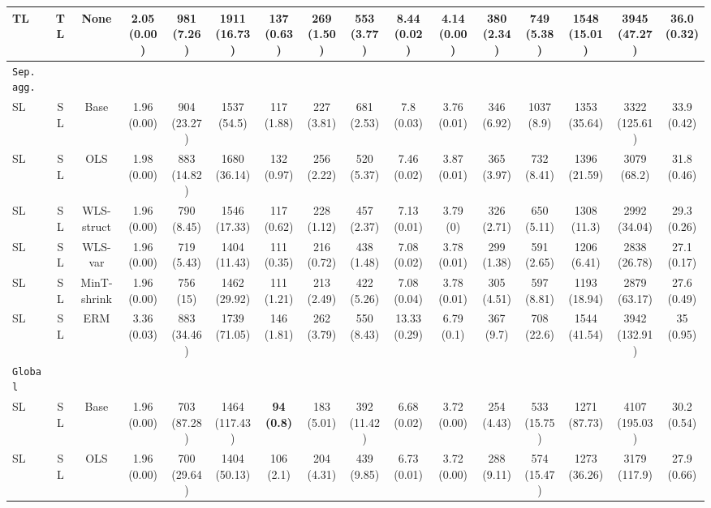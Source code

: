 \documentclass[preprint, 3p, times, twocolumn]{elsarticle}
\begin{document}
\begin{sidewaystable*}[t]
\begin{center}
{\begin{tabular}{l c cccccccccccccc}
  \hspace{0.1cm} 	TL	&TL	&None	&2.05 (0.00)	&981 (7.26)	&1911 (16.73)	&137 (0.63)	&269 (1.50)	&553 (3.77)	&8.44 (0.02)	&4.14 (0.00)	&380 (2.34)	&749 (5.38)	&1548 (15.01)	&3945 (47.27)	&36.0 (0.32)	\\
  \midrule																	
  \texttt{Sep. agg.}																	\\
  \hspace{0.1cm} 	SL	&SL	&Base	&1.96 (0.00)	&904 (23.27)	&1537 (54.5)	&117 (1.88)	&227 (3.81)	&681 (2.53)	&7.8 (0.03)	&3.76 (0.01)	&346 (6.92)	&1037 (8.9)	&1353 (35.64)	&3322 (125.61)	&33.9 (0.42)	\\
  \hspace{0.1cm} 	SL	&SL	&OLS	&1.98 (0.00)	&883 (14.82)	&1680 (36.14)	&132 (0.97)	&256 (2.22)	&520 (5.37)	&7.46 (0.02)	&3.87 (0.01)	&365 (3.97)	&732 (8.41)	&1396 (21.59)	&3079 (68.2)	&31.8 (0.46)	\\
  \hspace{0.1cm} 	SL	&SL	&WLS-struct	&1.96 (0.00)	&790 (8.45)	&1546 (17.33)	&117 (0.62)	&228 (1.12)	&457 (2.37)	&7.13 (0.01)	&3.79 (0)	&326 (2.71)	&650 (5.11)	&1308 (11.3)	&2992 (34.04)	&29.3 (0.26)	\\
  \hspace{0.1cm} 	SL	&SL	&WLS-var	&1.96 (0.00)	&719 (5.43)	&1404 (11.43)	&111 (0.35)	&216 (0.72)	&438 (1.48)	&7.08 (0.02)	&3.78 (0.01)	&299 (1.38)	&591 (2.65)	&1206 (6.41)	&2838 (26.78)	&27.1 (0.17)	\\
  \hspace{0.1cm} 	SL	&SL	&MinT-shrink	&1.96 (0.00)	&756 (15)	&1462 (29.92)	&111 (1.21)	&213 (2.49)	&422 (5.26)	&7.08 (0.04)	&3.78 (0.01)	&305 (4.51)	&597 (8.81)	&1193 (18.94)	&2879 (63.17)	&27.6 (0.49)	\\
  \hspace{0.1cm} 	SL	&SL	&ERM	&3.36 (0.03)	&883 (34.46)	&1739 (71.05)	&146 (1.81)	&262 (3.79)	&550 (8.43)	&13.33 (0.29)	&6.79 (0.1)	&367 (9.7)	&708 (22.6)	&1544 (41.54)	&3942 (132.91)	&35 (0.95)	\\
  \midrule																	
  \texttt{Global}																	\\
  \hspace{0.1cm} 	SL	&SL	&Base	&1.96 (0.00)	&703 (87.28)	&1464 (117.43)	&\textbf{94 (0.8)}	&183 (5.01)	&392 (11.42)	&6.68 (0.02)	&3.72 (0.00)	&254 (4.43)	&533 (15.75)	&1271 (87.73)	&4107 (195.03)	&30.2 (0.54)	\\
  \hspace{0.1cm} 	SL	&SL	&OLS	&1.96 (0.00)	&700 (29.64)	&1404 (50.13)	&106 (2.1)	&204 (4.31)	&439 (9.85)	&6.73 (0.01)	&3.72 (0.00)	&288 (9.11)	&574 (15.47)	&1273 (36.26)	&3179 (117.9)	&27.9 (0.66)	\\

\end{tabular}}
\end{center}
\end{sidewaystable*}
\end{document}
